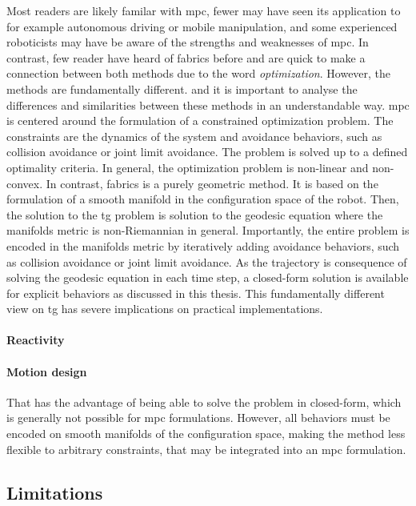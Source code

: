 Most readers are likely familar with \acl{mpc}, fewer may have seen its application
to for example autonomous driving or mobile manipulation, and some 
experienced roboticists may have be aware of the strengths and weaknesses of
\ac{mpc}. In contrast, few reader have heard of \acf{fabrics} before and are 
quick to make a connection between both methods due to the word
\textit{optimization}. However, the methods are fundamentally different.
and it is important to analyse the differences and similarities between
these methods in an understandable way.
\ac{mpc} is centered around the
formulation of a constrained optimization problem. The constraints are
the dynamics of the system and avoidance behaviors, such as collision avoidance
or joint limit avoidance. The problem is solved up to a defined optimality 
criteria. In general, the optimization problem is non-linear and non-convex.
In contrast, \ac{fabrics} is a purely geometric method. It is based on the
formulation of a smooth manifold in the configuration space of the robot.
Then, the solution to the \ac{tg} problem is solution to the geodesic equation
where the manifolds metric is non-Riemannian in general. Importantly, the entire
problem is encoded in the manifolds metric by iteratively adding avoidance
behaviors, such as collision avoidance or joint limit avoidance. As the
trajectory is consequence of solving the geodesic equation in each time step, a
closed-form solution is available for explicit behaviors as discussed in this
thesis.
This fundamentally different view on \ac{tg} has severe implications on
practical implementations.

\paragraph{Reactivity}
\label{par:discussion_reactivity}

\paragraph{Motion design}
\label{par:motion_design}


That has the advantage of being able to solve the problem in closed-form, which
is generally not possible for \ac{mpc} formulations. However, all behaviors must
be encoded on smooth manifolds of the configuration space, making the method
less flexible to arbitrary constraints, that may be integrated into an \ac{mpc}
formulation.

\subsection{Limitations}
\label{sec:discussion_limitations}

